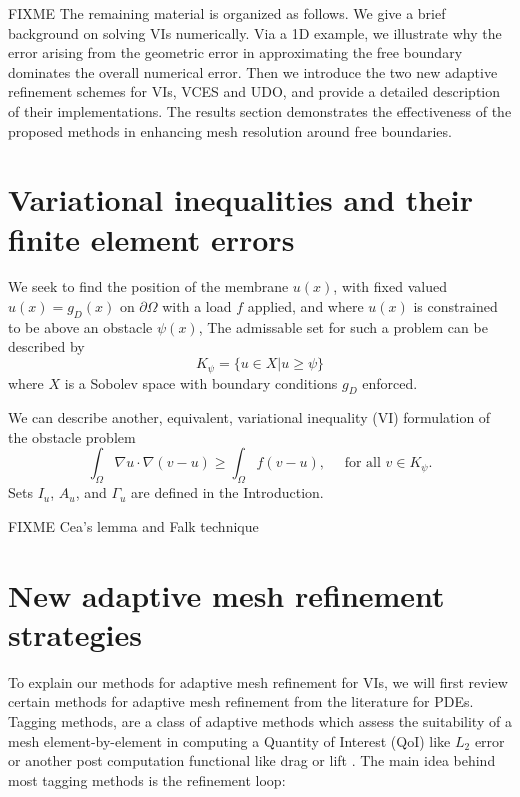 \documentclass[]{interact}
\theoremstyle{plain}%
\theoremstyle{definition}
\theoremstyle{remark}
\begin{document}
FIXME The remaining material is organized as follows.  We give a brief background on solving VIs numerically.  Via a 1D example, we illustrate why the error arising from the geometric error in approximating the free boundary dominates the overall numerical error.   Then we introduce the two new adaptive refinement schemes for VIs, VCES and UDO, and provide a detailed description of their implementations.  The results section demonstrates the effectiveness of the proposed methods in enhancing mesh resolution around free boundaries. 


\section{Variational inequalities and their finite element errors} \label{sec:vifem}

We seek to find the position of the membrane $u(x)$, with fixed valued $u(x) = g_D(x)$ on $\partial \Omega$ with a load $f$ applied, and where $u(x)$ is constrained to be above an obstacle $\psi(x)$, 
The admissable set for such a problem can be described by 
  \begin{equation}
    K_\psi = \{u \in X| u \geq \psi \}
  \end{equation}
  where $X$ is a Sobolev space with boundary conditions $g_D$ enforced. 
  
  We can describe another, equivalent, variational inequality (VI) formulation of the obstacle problem 
  \begin{equation}
    \int_\Omega \nabla u \cdot \nabla(v - u) \geq \int_\Omega f(v - u), \quad \text{ for all } v \in K_\psi.
  \end{equation} 
Sets $I_u$, $A_u$, and $\Gamma_u$ are defined in the Introduction.

FIXME Cea's lemma and Falk technique



\section{New adaptive mesh refinement strategies} \label{sec:viamr}

To explain our methods for adaptive mesh refinement for VIs, we will first review certain methods for adaptive mesh refinement from the literature for PDEs.  Tagging methods, are a class of adaptive methods which assess the suitability of a mesh element-by-element in computing a Quantity of Interest (QoI) like $L_2$ error or another post computation functional like drag or lift \cite{bangerth_adaptive_2003}. The main idea behind most tagging methods is the refinement loop:
\end{document}
